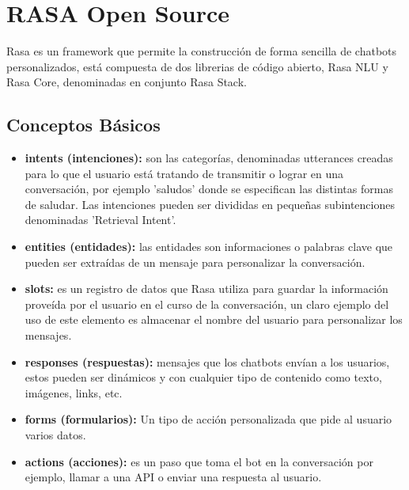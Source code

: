 \chapter[RASA]{RASA Open Source}
Rasa es un framework que permite la construcción de forma sencilla de chatbots personalizados, está compuesta de dos librerias de código abierto, Rasa NLU y Rasa Core, denominadas en conjunto Rasa Stack.
\indent 
\section{Conceptos Básicos}
\begin{itemize}
    \item \textbf{intents (intenciones): }son las categorías, denominadas utterances creadas para lo que el usuario está tratando de transmitir o lograr en una conversación, por ejemplo 'saludos' donde se especifican las distintas formas de saludar. Las intenciones pueden ser divididas en pequeñas subintenciones denominadas 'Retrieval Intent'.
    \item \textbf{entities (entidades): } las entidades son informaciones o palabras clave que pueden ser extraídas de un mensaje para personalizar la conversación.
    \item \textbf{slots:} es un registro de datos que Rasa utiliza para guardar la información proveída por el usuario en el curso de la conversación, un claro ejemplo del uso de este elemento es almacenar el nombre del usuario para personalizar los mensajes.
    \item \textbf{responses (respuestas):} mensajes que los chatbots envían a los usuarios, estos pueden ser dinámicos y con cualquier tipo de contenido como texto, imágenes, links, etc.
    \item \textbf{forms (formularios):} Un tipo de acción personalizada que pide al usuario varios datos.
    \item \textbf{actions (acciones):} es un paso que toma el bot en la conversación por ejemplo, llamar a una API o enviar una respuesta al usuario.\cite{Glossary}
\end{itemize}

